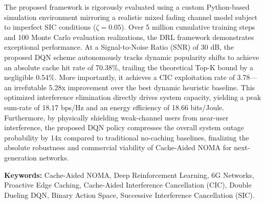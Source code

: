 \documentclass[12pt,a4paper]{article}
\begin{document}
\begin{singlespace}
The proposed framework is rigorously evaluated using a custom Python-based simulation environment mirroring a realistic mixed fading channel model subject to imperfect SIC conditions ($\zeta=0.05$). Over 5 million cumulative training steps and 100 Monte Carlo evaluation realizations, the DRL framework demonstrates exceptional performance. At a Signal-to-Noise Ratio (SNR) of 30 dB, the proposed DQN scheme autonomously tracks dynamic popularity shifts to achieve an absolute cache hit rate of 70.38\%, trailing the theoretical Top-K bound by a negligible 0.54\%. More importantly, it achieves a CIC exploitation rate of 3.78—an irrefutable 5.28x improvement over the best dynamic heuristic baseline. This optimized interference elimination directly drives system capacity, yielding a peak sum-rate of 18.17 bps/Hz and an energy efficiency of 18.66 bits/Joule. Furthermore, by physically shielding weak-channel users from near-user interference, the proposed DQN policy compresses the overall system outage probability by 14x compared to traditional no-caching baselines, finalizing the absolute robustness and commercial viability of Cache-Aided NOMA for next-generation networks.

\vspace{0.5cm}

\noindent
\textbf{Keywords:} Cache-Aided NOMA, Deep Reinforcement Learning, 6G Networks, Proactive Edge Caching, Cache-Aided Interference Cancellation (CIC), Double Dueling DQN, Binary Action Space, Successive Interference Cancellation (SIC).
\end{singlespace}

\thispagestyle{plain}



\clearpage

\renewcommand{\cfttoctitlefont}{\normalfont\bfseries\fontsize{14}{17}\selectfont}
\renewcommand{\cftaftertoctitle}{\hfill}
\renewcommand{\contentsname}{TABLE OF CONTENTS} %

\setlength{\cftsecnumwidth}{2.5em}
\setlength{\cftsecindent}{0pt}
\setlength{\cftbeforesecskip}{6pt}
\setlength{\cftsubsecnumwidth}{3.5em}
\setlength{\cftsubsecindent}{2.5em}
\end{document}
